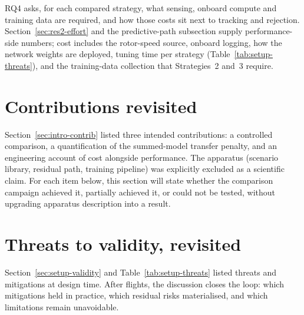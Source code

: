 RQ4 asks, for each compared strategy, what sensing, onboard compute and training data are required,
and how those costs sit next to tracking and rejection. Section~\ref{sec:res2-effort} and the
predictive-path subsection supply performance-side numbers; cost includes the rotor-speed source,
onboard logging, how the network weights are deployed, tuning time per strategy
(Table~\ref{tab:setup-threats}), and the training-data collection that Strategies~2 and~3 require.


\section{Contributions revisited}
\label{sec:disc-contrib}

Section~\ref{sec:intro-contrib} listed three intended contributions: a controlled comparison,
a quantification of the summed-model transfer penalty, and an engineering account of cost alongside
performance. The apparatus (scenario library, residual path, training pipeline) was explicitly
excluded as a scientific claim. For each item below, this section will state whether the
comparison campaign achieved it, partially achieved it, or could not be tested, without upgrading apparatus
description into a result.




\section{Threats to validity, revisited}
\label{sec:disc-validity}

Section~\ref{sec:setup-validity} and Table~\ref{tab:setup-threats} listed threats and mitigations
at design time. After flights, the discussion closes the loop: which mitigations held in practice,
which residual risks materialised, and which limitations remain unavoidable.

